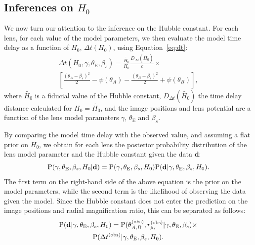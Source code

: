 \documentclass[usenatbib]{mnras}
\def\radmagrat{r_{\mu_r}}
\def\tein{\theta_{\mathrm{E}}}
\def\data{\mathbf{d}}
\def\Eref#1{Equation~\ref{#1}\xspace}
\def\pr{{\rm P}}
\begin{document}
\subsection{Inferences on $H_0$}
We now turn our attention to the inference on the Hubble constant.
For each lens, for each value of the model parameters, we then evaluate the model time delay as a function of $H_0$, $\Delta t(H_0)$, using \Eref{eq:dt}:
\begin{multline}
\Delta t (H_0, \gamma, \tein, \beta_s) = \frac{\tilde{H_0}}{H_0}\frac{D_{\Delta t}(\tilde{H_0})}{c} \times \\
\left[\frac{(\theta_A - \beta_s)^2}{2} - \psi(\theta_A) - \frac{(\theta_B - \beta_s)^2}{2} + \psi(\theta_B)\right],
\end{multline}
where $\tilde{H_0}$ is a fiducial value of the Hubble constant, $D_{\Delta t}(\tilde{H_0})$ the time delay distance calculated for $H_0=\tilde{H_0}$, and the image positions and lens potential are a function of the lens model parameters $\gamma$, $\tein$ and $\beta_s$.

By comparing the model time delay with the observed value, and assuming a flat prior on $H_0$, we obtain for each lens the posterior probability distribution of the lens model parameter and the Hubble constant given the data $\data$:
\begin{equation}
\pr(\gamma, \tein, \beta_s, H_0 | \data) = \pr(\gamma, \tein, \beta_s, H_0) \pr(\data | \gamma, \tein, \beta_s, H_0).
\end{equation}
The first term on the right-hand side of the above equation is the prior on the model parameters, while the second term is the likelihood of observing the data given the model.
Since the Hubble constant does not enter the prediction on the image positions and radial magnification ratio, this can be separated as follows:
\begin{multline}
\pr(\data | \gamma, \tein, \beta_s, H_0) = \pr(\theta_{A,B}^{\mathrm{(obs)}},\radmagrat^{\mathrm{(obs)}} | \gamma, \tein, \beta_s) \times \\
\pr(\Delta t^{\mathrm{(obs)}} | \gamma, \tein, \beta_s, H_0).
\end{multline}
\end{document}
